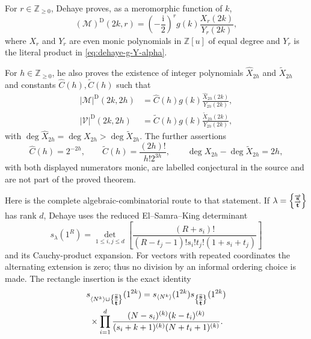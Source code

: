 \begin{theorem}
\label{thm:dehaye-rational-source}
For $r\in\mathbb Z_{\geq0}$, Dehaye proves, as a meromorphic function of $k$,
\begin{equation}
 (\mathcal M)^{\mathrm D}(2k,r)
 =\left(-\frac{\mathrm i}{2}\right)^r g(k)
   \frac{X_r(2k)}{Y_r(2k)},
 \label{eq:dehaye-complex-rational-form}
\end{equation}
where $X_r$ and $Y_r$ are even monic polynomials in $\mathbb Z[u]$ of equal
degree and $Y_r$ is the literal product in \eqref{eq:dehaye-g-Y-alpha}.

For $h\in\mathbb Z_{\geq0}$, he also proves the existence of integer polynomials
$\widehat X_{2h}$ and $\widetilde X_{2h}$ and constants
$\widehat C(h),\widetilde C(h)$ such that
\begin{align}
 |\mathcal M|^{\mathrm D}(2k,2h)
 &=\widehat C(h)g(k)\frac{\widehat X_{2h}(2k)}{Y_{2h}(2k)},
 \label{eq:dehaye-absolute-M-rational-form}\\
 |\mathcal V|^{\mathrm D}(2k,2h)
 &=\widetilde C(h)g(k)\frac{\widetilde X_{2h}(2k)}{Y_{2h}(2k)},
 \label{eq:dehaye-absolute-V-rational-form}
\end{align}
with
$\deg\widehat X_{2h}=\deg X_{2h}>\deg\widetilde X_{2h}$.
The further assertions
\[
 \widehat C(h)=2^{-2h},\qquad
 \widetilde C(h)=\frac{(2h)!}{h!2^{3h}},\qquad
 \deg X_{2h}-\deg\widetilde X_{2h}=2h,
\]
with both displayed numerators monic, are labelled conjectural in the source and are
not part of the proved theorem.
\end{theorem}

Here is the complete algebraic-combinatorial route to that statement.  If
$\lambda=\left\{\substack{{\overrightarrow{\mathbf{s}}}\\{\overrightarrow{\mathbf{t}}}}\right\}$ has rank $d$, Dehaye uses the reduced
El--Samra--King determinant
\begin{equation}
 s_\lambda(1^R)=
 \det_{1\leq i,j\leq d}
 \left[\frac{(R+s_i)!}{(R-t_j-1)!s_i!t_j!(1+s_i+t_j)}\right]
 \label{eq:dehaye-frobenius-dimension}
\end{equation}
and its Cauchy-product expansion.  For vectors with repeated coordinates the
alternating extension is zero; thus no division by an informal ordering choice is
made.  The rectangle insertion is the exact identity
\begin{multline}
 s_{\langle N^k\rangle\cup\left\{\substack{{\overline{\mathbf{s}}}\\{\overline{\mathbf{t}}}}\right\}}(1^{2k})
 =s_{\langle N^k\rangle}(1^{2k})s_{\left\{\substack{{\overline{\mathbf{s}}}\\{\overline{\mathbf{t}}}}\right\}}(1^{2k})\\
 {}\times\prod_{i=1}^{d}
 \frac{(N-s_i)^{(k)}(k-t_i)^{(k)}}
 {(s_i+k+1)^{(k)}(N+t_i+1)^{(k)}}.
 \label{eq:dehaye-rectangle-insertion}
\end{multline}

